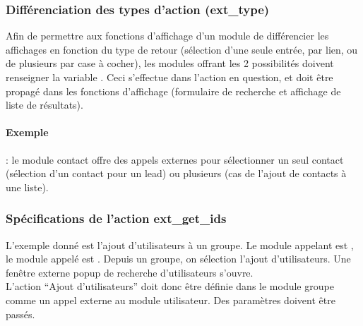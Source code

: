 \subsubsection{Différenciation des types d'action (ext\_type)}

Afin de permettre aux fonctions d'affichage d'un module de différencier les affichages en fonction du type de retour (sélection d'une seule entrée, par lien, ou de plusieurs par case à cocher), les modules offrant les 2 possibilités doivent renseigner la variable .
Ceci s'effectue dans l'action en question, et doit être propagé dans les fonctions d'affichage (formulaire de recherche et affichage de liste de résultats).

\paragraph{Exemple} : le module contact offre des appels externes pour sélectionner un seul contact (sélection d'un contact pour un lead) ou plusieurs (cas de l'ajout de contacts à une liste).


\subsubsection{Spécifications de l'action ext\_get\_ids}

L'exemple donné est l'ajout d'utilisateurs à un groupe.
Le module appelant est \group, le module appelé est \user.
Depuis un groupe, on sélection l'ajout d'utilisateurs. Une fenêtre externe popup de recherche d'utilisateurs s'ouvre.\\

L'action ``Ajout d'utilisateurs'' doit donc être définie dans le module groupe comme un appel externe au module utilisateur.
Des paramètres doivent être passés.\\

